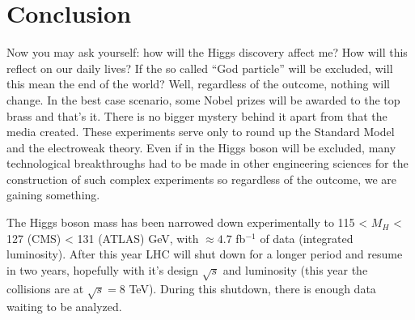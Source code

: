 \section{Conclusion}

Now you may ask yourself: how will the Higgs discovery affect me? How will this reflect on our daily lives? If the so
called ``God particle'' will be excluded, will this mean the end of the world? Well, regardless of the outcome, nothing
will change. In the best case scenario, some Nobel prizes will be awarded to the top brass and that's it. There is no bigger
mystery behind it apart from that the media created. These experiments serve only to round up the Standard Model and
the electroweak theory. Even if in the Higgs boson will be excluded, many technological breakthroughs had to be made
in other engineering sciences for the construction of such complex experiments so regardless of the outcome, we are gaining
something.

The Higgs boson mass has been narrowed down experimentally to 115 < $M_H$ < 127 (CMS) < 131 (ATLAS) GeV, with $\approx 4.7$ fb$^{-1}$
of data (integrated luminosity). After this year LHC will shut down for a longer period and resume in two years, hopefully
with it's design $\sqrt{s}$ and luminosity (this year the collisions are at $\sqrt{s} = 8$ TeV). During this shutdown, there
is enough data waiting to be analyzed.
